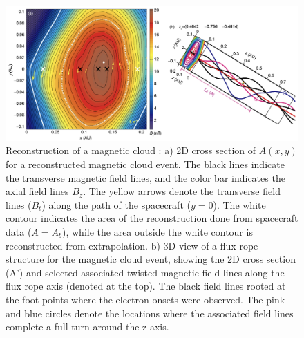 \begin{figure}[ht!]
    \centering
    \includegraphics[width=\textwidth]{Figures/Reconstructions/Hu2015_GSreconstruction.png}
    \caption[2D reconstruction of a magnetic cloud using the GS-reconstruction algorithm]{Reconstruction of a magnetic cloud \citep{Hu:2015}: a) 2D cross section of $A(x,y)$ for a reconstructed magnetic cloud event. The black lines indicate the transverse magnetic field lines, and the color bar indicates the axial field lines $B_z$. The yellow arrows denote the transverse field lines ($B_t$) along the path of the spacecraft ($y=0$). The white contour indicates the area of the reconstruction done from spacecraft data ($A=A_b$), while the area outside the white contour is reconstructed from extrapolation. b) 3D view of a flux rope structure for the magnetic cloud event, showing the 2D cross section (A') and selected associated twisted magnetic field lines along the flux rope axis (denoted at the top). The black field lines  rooted at the foot points where the electron onsets were observed. The pink and blue circles denote the locations where the associated field lines complete a full turn around the z-axis.}
    \label{fig:GSreconstruction_Hu2015}
\end{figure}

